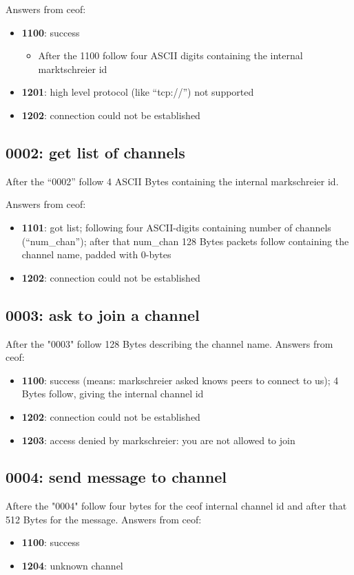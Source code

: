 \documentclass[12pt,a4paper]{article}
\begin{document}
Answers from ceof:
\begin{itemize}
\item \textbf{1100}: success
\begin{itemize}
\item After the 1100 follow four ASCII digits containing the
internal marktschreier id
\end{itemize}
\item \textbf{1201}: high level protocol (like "`tcp://"') not supported
\item \textbf{1202}: connection could not be established
\end{itemize}
\subsection{0002: get list of channels}
After the "`0002"' follow 4 ASCII Bytes containing the internal
markschreier id.

Answers from ceof:

\begin{itemize}
\item \textbf{1101}: got list; following four ASCII-digits containing
number of channels ("`num\_chan"'); after that  num\_chan 128 Bytes packets
follow containing the channel name, padded with 0-bytes
\item \textbf{1202}: connection could not be established
\end{itemize}

\subsection{0003: ask to join a channel}
After the "0003" follow 128 Bytes describing the channel name.
Answers from ceof:
\begin{itemize}
\item \textbf{1100}: success (means: markschreier asked knows peers to
connect to us); 4 Bytes follow, giving the internal channel id
\item \textbf{1202}: connection could not be established
\item \textbf{1203}: access denied by markschreier: you are not allowed to join
\end{itemize}
\subsection{0004: send message to channel}
Aftere the "0004" follow four bytes for the ceof internal channel id and after
that 512 Bytes for the message.
Answers from ceof:
\begin{itemize}
\item \textbf{1100}: success
\item \textbf{1204}: unknown channel
\end{itemize}
\end{document}
